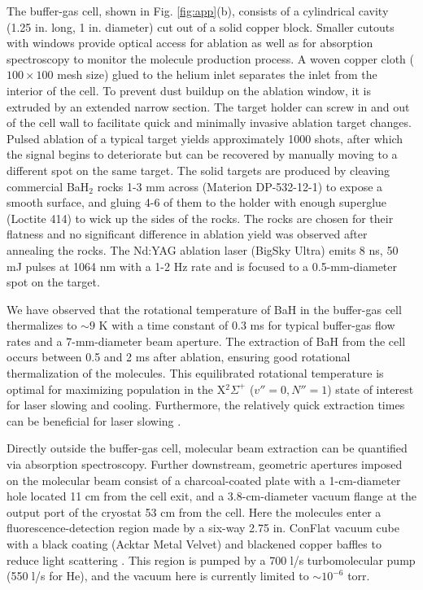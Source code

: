 \documentclass[amsmath,amssymb,aps,twocolumn,longbibliography,notitlepage]{revtex4-1}
\begin{document}
The buffer-gas cell, shown in Fig. \ref{fig:app}(b), consists of a cylindrical cavity (1.25 in. long, 1 in. diameter) cut out of a solid copper block.  Smaller cutouts with windows provide optical access for ablation as well as for absorption spectroscopy to monitor the molecule production process.  A woven copper cloth ($100\times100$ mesh size) glued to the helium inlet separates the inlet from the interior of the cell.  To prevent dust buildup on the ablation window, it is extruded by an extended narrow section.  The target holder can screw in and out of the cell wall to facilitate quick and minimally invasive ablation target changes.  Pulsed ablation of a typical target \cite{ZelevinskyTaralloPRA16_BaH} yields approximately 1000 shots, after which the signal begins to deteriorate but can be recovered by manually moving to a different spot on the same target.  The solid targets are produced by cleaving commercial BaH$_2$ rocks 1-3 mm across (Materion DP-532-12-1) to expose a smooth surface, and gluing 4-6 of them to the holder with enough superglue (Loctite 414) to wick up the sides of the rocks.  The rocks are chosen for their flatness and no significant difference in ablation yield was observed after annealing the rocks.  The Nd:YAG ablation laser (BigSky Ultra) emits 8 ns, 50 mJ pulses at 1064 nm with a 1-2 Hz rate and is focused to a 0.5-mm-diameter spot on the target.

We have observed that the rotational temperature of BaH in the buffer-gas cell thermalizes to $\sim9$ K with a time constant of 0.3 ms for typical buffer-gas flow rates and a 7-mm-diameter beam aperture.  The extraction of BaH from the cell occurs between 0.5 and 2 ms after ablation, ensuring good rotational thermalization of the molecules.  This equilibrated rotational temperature is optimal for maximizing population in the X$^2\Sigma^+$ ($v''=0,N''=1$) state of interest for laser slowing and cooling.  Furthermore, the relatively quick extraction times can be beneficial for laser slowing \cite{TarbuttTruppeNJP17_CaFChirpedLaserSlowing}.

Directly outside the buffer-gas cell, molecular beam extraction can be quantified via absorption spectroscopy.  Further downstream,
geometric apertures imposed on the molecular beam consist of a charcoal-coated plate with a 1-cm-diameter hole located 11 cm from the cell exit, and a 3.8-cm-diameter vacuum flange at the output port of the cryostat 53 cm from the cell.  Here the molecules enter a fluorescence-detection region made by a six-way 2.75 in. ConFlat vacuum cube with a black coating (Acktar Metal Velvet) and blackened copper baffles to reduce light scattering \cite{DeMilleNorrgardRSI16_InVacuumSurfaceBlackening}.  This region is pumped by a 700 l/s turbomolecular pump (550 l/s for He), and the vacuum here is currently limited to $\sim10^{-6}$ torr.
\end{document}
